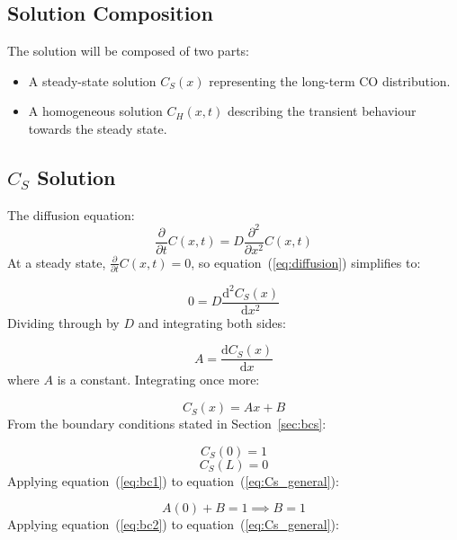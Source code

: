 \documentclass[a4paper,12pt]{article} %
\newcommand{\CS}{C_{S}}
\newcommand{\CH}{C_{H}}
\begin{document}
\subsection{Solution Composition}

The solution will be composed of two parts:
\begin{itemize}
    \item A steady-state solution $\CS(x)$ representing the long-term CO distribution.
    \item A homogeneous solution $\CH(x,t)$ describing the transient behaviour towards the steady state.
\end{itemize}

\subsection{$\CS$ Solution}
The diffusion equation:
\begin{equation}
    \label{eq:diffusion}
    \frac{\partial}{\partial t}C(x,t) = D \frac{\partial^2}{\partial x^2}C(x,t)
\end{equation}
At a steady state, $\frac{\partial}{\partial t}C(x, t) = 0$, so equation~(\ref{eq:diffusion}) simplifies to:

\begin{equation}
    \label{eq:steady_state_ode}
    0 = D\frac{\mathrm{d}^2\CS(x)}{\mathrm{d}x^2}
\end{equation}
Dividing through by $D$ and integrating both sides:

\begin{equation}
    \label{eq:first_integral}
    A = \frac{\mathrm{d}\CS(x)}{\mathrm{d}x}
\end{equation}
where $A$ is a constant. Integrating once more:

\begin{equation}
    \label{eq:Cs_general}
    \CS(x) = Ax + B
\end{equation}
From the boundary conditions stated in Section~\ref{sec:bcs}:

\begin{equation}
    \label{eq:bc1}
    \CS(0) = 1
\end{equation}
\begin{equation}
    \label{eq:bc2}
    \CS(L) = 0
\end{equation}
Applying equation~(\ref{eq:bc1}) to equation~(\ref{eq:Cs_general}):

\begin{equation}
    \label{eq:B_value}
    A(0) + B = 1 \implies B = 1
\end{equation}
Applying equation~(\ref{eq:bc2}) to equation~(\ref{eq:Cs_general}):
\end{document}
